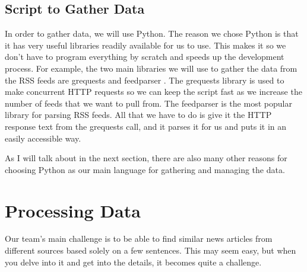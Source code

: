 \documentclass[onecolumn, draftclsnofoot,10pt, compsoc]{IEEEtran}
\begin{document}
\subsection{Script to Gather Data}
In order to gather data, we will use Python. The reason we chose Python is that it has very useful libraries readily available for us to use. This makes it so we don't have to program everything by scratch and speeds up the development process. For example, the two main libraries we will use to gather the data from the RSS feeds are grequests and feedparser \cite{grequests}\cite{feedparser}. The grequests library is used to make concurrent HTTP requests so we can keep the script fast as we increase the number of feeds that we want to pull from. The feedparser is the most popular library for parsing RSS feeds. All that we have to do is give it the HTTP response text from the grequests call, and it parses it for us and puts it in an easily accessible way.\par
As I will talk about in the next section, there are also many other reasons for choosing Python as our main language for gathering and managing the data.
\section{Processing Data}
Our team's main challenge is to be able to find similar news articles from different sources based solely on a few sentences. This may seem easy, but when you delve into it and get into the details, it becomes quite a challenge.
\end{document}
